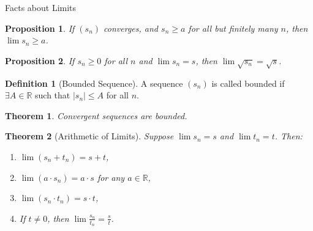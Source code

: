 \documentclass[7pt]{article}
\theoremstyle{definition}
\newtheorem{definition}{Definition}
\theoremstyle{plain}
\newtheorem{theorem}{Theorem}
\newtheorem{proposition}{Proposition}
\begin{document}


{Facts about Limits}
\begin{proposition}
If $ (s_n) $ converges, and $ s_n \geq a $ for all but finitely many $ n $, then $ \lim s_n \geq a $.
\end{proposition}

\begin{proposition}
If $ s_n \geq 0 $ for all $ n $ and $ \lim s_n = s $, then $ \lim \sqrt{s_n} = \sqrt{s} $.
\end{proposition}

\begin{definition}[Bounded Sequence]
A sequence $ (s_n) $ is called bounded if $ \exists A \in \mathbb{R} $ such that $ |s_n| \leq A $ for all $ n $.
\end{definition}

\begin{theorem}
Convergent sequences are bounded.
\end{theorem}


\begin{theorem}[Arithmetic of Limits]
Suppose $ \lim s_n = s $ and $ \lim t_n = t $. Then:
\begin{enumerate}
    \item $ \lim (s_n + t_n) = s + t $,
    \item $ \lim (a \cdot s_n) = a \cdot s $ for any $ a \in \mathbb{R} $,
    \item $ \lim (s_n \cdot t_n) = s \cdot t $,
    \item If $ t \neq 0 $, then $ \lim \frac{s_n}{t_n} = \frac{s}{t} $.
\end{enumerate}
\end{theorem}
\end{document}
